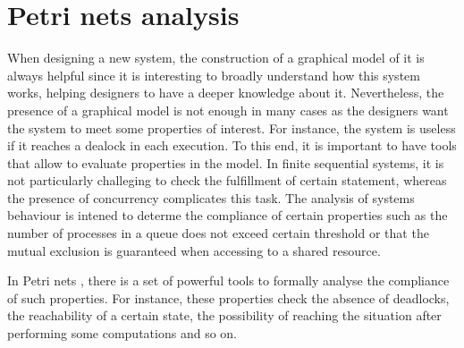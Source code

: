 %
%

\section{Petri nets analysis}
When designing a new system, the construction of a graphical model of it is always
helpful since it is interesting to broadly understand how this system works, helping designers to have a
deeper knowledge about it. Nevertheless, the presence of a graphical model is not enough in many cases
as the designers want the system to meet some properties of interest. For instance, the system is useless
if it reaches a dealock in each execution.  To this end, it is important to have tools that allow to
evaluate properties in the model. In finite sequential systems, it is not particularly challeging to check
the fulfillment of certain statement, whereas the presence of concurrency complicates this task.
The analysis of systems behaviour is intened to determe the compliance of 
certain properties such as the number of processes in a queue does not exceed
certain threshold or that the mutual exclusion is guaranteed when accessing to a shared resource.

In Petri nets , there is a set of powerful tools to formally analyse
the compliance of such properties. For instance, these properties check
the absence of deadlocks, the reachability of a certain
state, the possibility of reaching the situation after performing some computations and so on.


